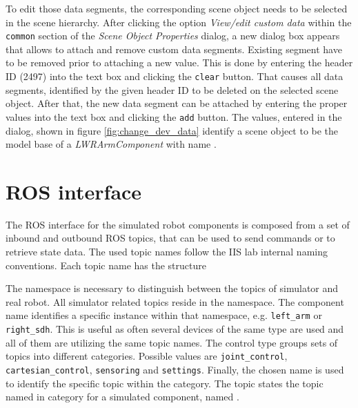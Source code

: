 To edit those data segments, the corresponding scene object needs to be selected in the scene hierarchy. After clicking the option \emph{View/edit custom data} within the \texttt{common} section of the \emph{Scene Object Properties} dialog, a new dialog box appears that allows to attach and remove custom data segments. Existing segment have to be removed prior to attaching a new value. This is done by entering the header ID (2497) into the text box and clicking the \texttt{clear} button. That causes all data segments, identified by the given header ID to be deleted on the selected scene object. After that, the new data segment can be attached by entering the proper values into the text box and clicking the \texttt{add} button. The values, entered in the dialog, shown in figure \ref{fig:change_dev_data} identify a scene object to be the model base of a \emph{LWRArmComponent} with name .

\section{ROS interface}

The ROS interface for the simulated robot components is composed from a set of inbound and outbound ROS topics, that can be used to send commands or to retrieve state data. The used topic names follow the IIS lab internal naming conventions. Each topic name has the structure
\begin{center}
\end{center}

The namespace is necessary to distinguish between the topics of simulator and real robot. All simulator related topics reside in the  namespace. The component name identifies a specific instance within that namespace, e.g. \texttt{left\_arm} or \texttt{right\_sdh}. This is useful as often several devices of the same type are used and all of them are utilizing the same topic names. The control type groups sets of topics into different categories. Possible values are \texttt{joint\_control}, \texttt{cartesian\_control}, \texttt{sensoring} and \texttt{settings}. Finally, the chosen name is used to identify the specific topic within the category. The topic  states the topic named  in category  for a simulated component, named . \\

